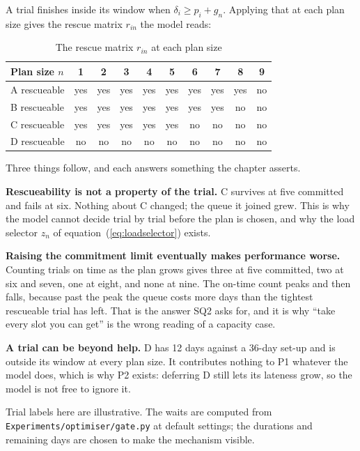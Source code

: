 A trial finishes inside its window when $\delta_i \ge p_i + g_n$. Applying that at each plan size gives the rescue matrix $r_{in}$ the model reads:

\begin{table}[htbp]
  \centering
  \caption{The rescue matrix $r_{in}$ at each plan size}
  \label{tab:rescue}
  \begin{tabular}{@{}lccccccccc@{}}
    \toprule
    Plan size $n$ & 1 & 2 & 3 & 4 & 5 & 6 & 7 & 8 & 9 \\
    \midrule
    A rescueable & yes & yes & yes & yes & yes & yes & yes & yes & no \\
    B rescueable & yes & yes & yes & yes & yes & yes & yes & no & no \\
    C rescueable & yes & yes & yes & yes & yes & no & no & no & no \\
    D rescueable & no & no & no & no & no & no & no & no & no \\
    \bottomrule
  \end{tabular}
\end{table}

Three things follow, and each answers something the chapter asserts.

\textbf{Rescueability is not a property of the trial.} C survives at five committed and fails at six. Nothing about C changed; the queue it joined grew. This is why the model cannot decide trial by trial before the plan is chosen, and why the load selector $z_n$ of equation~(\ref{eq:loadselector}) exists.

\textbf{Raising the commitment limit eventually makes performance worse.} Counting trials on time as the plan grows gives three at five committed, two at six and seven, one at eight, and none at nine. The on-time count peaks and then falls, because past the peak the queue costs more days than the tightest rescueable trial has left. That is the answer SQ2 asks for, and it is why ``take every slot you can get'' is the wrong reading of a capacity case.

\textbf{A trial can be beyond help.} D has 12 days against a 36-day set-up and is outside its window at every plan size. It contributes nothing to P1 whatever the model does, which is why P2 exists: deferring D still lets its lateness grow, so the model is not free to ignore it.

Trial labels here are illustrative. The waits are computed from \texttt{Experiments/optimiser/}\allowbreak\texttt{gate.py} at default settings; the durations and remaining days are chosen to make the mechanism visible.
